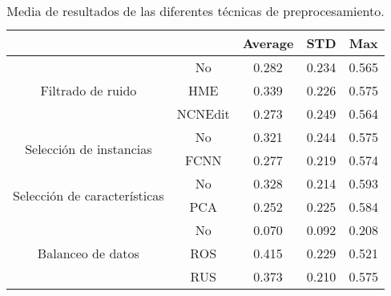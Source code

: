 \begin{table}
    \centering
    \begin{tabular}{cc|c|c|c|}
    \cline{3-5}
    \multicolumn{1}{l}{\textbf{}} & \textbf{} & \multicolumn{1}{c|}{\textbf{Average}} & \multicolumn{1}{c|}{\textbf{STD}} & \textbf{Max} \\ \hline
    \multicolumn{1}{|c|}{\multirow{3}{*}{Filtrado de ruido}}       & No        & 0.282  & 0.234
    & 0.565    \\ \cline{2-5} 
    \multicolumn{1}{|c|}{}  & HME       & 0.339   & 0.226    & 0.575        \\ \cline{2-5} 
    \multicolumn{1}{|c|}{}  & NCNEdit   & 0.273   & 0.249    & 0.564        \\ \hline
    \multicolumn{1}{|c|}{\multirow{2}{*}{Selección de instancias}} & No        & 0.321  & 0.244    & 0.575        \\ \cline{2-5} 
    \multicolumn{1}{|c|}{}  & FCNN      & 0.277   & 0.219    & 0.574        \\ \hline
    \multicolumn{1}{|c|}{\multirow{2}{*}{Selección de características}} & No        & 0.328  & 0.214    & 0.593        \\ \cline{2-5} 
    \multicolumn{1}{|c|}{}  & PCA      & 0.252    & 0.225    & 0.584        \\ \hline
    \multicolumn{1}{|c|}{\multirow{3}{*}{Balanceo de datos}}       & No        & 0.070  & 0.092    & 0.208        \\ \cline{2-5} 
    \multicolumn{1}{|c|}{}  & ROS       & 0.415   & 0.229    & 0.521        \\ \cline{2-5} 
    \multicolumn{1}{|c|}{}  & RUS       & 0.373   & 0.210    & 0.575        \\ \hline
    \end{tabular}
    \caption{Media de resultados de las diferentes técnicas de preprocesamiento.}
    \label{avg}
\end{table}

